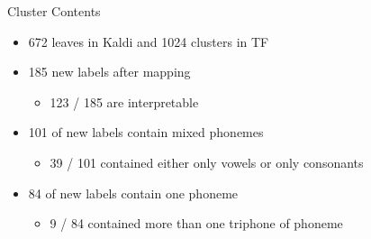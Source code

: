 \documentclass[final]{beamer} %
\newlength{\columnheight}
\begin{document}
\begin{frame}
\begin{columns}
    
    \begin{column}{0.23\textwidth}
      \parbox[t][\columnheight]{.9\textwidth}{
        \vspace{1cm}               %
        
        \begin{block}{\boxnumber Cluster Contents}
          
          \begin{itemize}
          \item 672 leaves in Kaldi and 1024 clusters in TF
          \item 185 new labels after mapping
            \begin{itemize}
            \item 123 / 185 are interpretable
            \end{itemize}
          \item 101 of new labels contain mixed phonemes
            \begin{itemize}
            \item 39 / 101 contained either only vowels or only consonants
            \end{itemize}
          \item 84 of new labels contain one phoneme
            \begin{itemize}
            \item 9 / 84 contained more than one triphone of phoneme
            \end{itemize}
          \end{itemize}
          
        \end{block}

        \vfill
        
}
\end{column}
\end{columns}
\end{frame}
\end{document}
